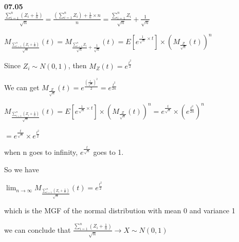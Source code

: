 {\bf 07.05} \quad \\

$ \frac{\sum_{i=1}^{n} (Z_i+ \frac{1}{n} ) }{\sqrt{n}} =\frac{ (\sum_{i=1}^{n} Z_i)  + \frac{1}{n} \times n }{n}=\frac{\sum_{i=1}^{n} Z_i}{\sqrt{n}} + \frac{1}{\sqrt{n}} $ 
\par

$ M_{\frac{\sum_{i=1}^{n} (Z_i+ \frac{1}{n} ) }{\sqrt{n}} } (t)= M_{\frac{\sum_{i=1}^{n} Z_i}{\sqrt{n}} + \frac{1}{\sqrt{n}} } (t) = E[e^  { \frac{1}{\sqrt{n}} \times t} ] \times (M_ {\frac{Z}{\sqrt{n}}} ( t ) )^n $ 

Since $Z_i \sim N(0,1)$, then $M_Z (t)= e^ \frac {t^2}{2} $

We can get $M_ {\frac{Z}{\sqrt{n}}} ( t )= e^ \frac {( \frac{t}{\sqrt{n}})^2}{2} = e^ \frac{t^2}{2n}$

$ M_{\frac{\sum_{i=1}^{n} (Z_i+ \frac{1}{n} ) }{\sqrt{n}} } (t)= E[e^  { \frac{1}{\sqrt{n}} \times t} ] \times (M_ {\frac{Z}{\sqrt{n}}} ( t ) )^n = e^ \frac{t}{\sqrt{n}} \times (e^ \frac{t^2}{2n})^n $
\par

$ = e^ \frac{t}{\sqrt{n}} \times e^ \frac{t^2}{2}  $

when n goes to infinity, $ e^ \frac{t}{\sqrt{n}} $ goes to 1. \par
So we have \par
$ \lim_{n \to \infty} M_{\frac{\sum_{i=1}^{n} (Z_i+ \frac{1}{n} ) }{\sqrt{n}} } (t) =  e^ \frac{t^2}{2} $ \par
which is the MGF of the normal distribution with mean 0 and variance 1 \par
we can conclude that $ \frac{\sum_{i=1}^{n} (Z_i+ \frac{1}{n} ) }{\sqrt{n}} \to X  \sim N(0,1)$ \\
